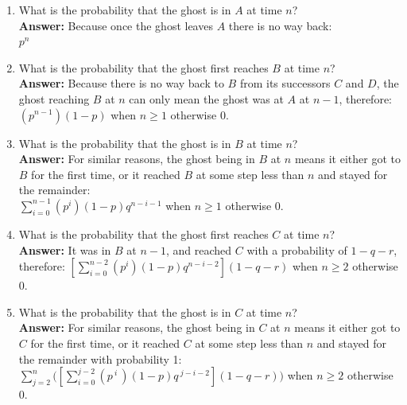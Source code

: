 \documentclass{homework}
\begin{document}
\begin{enumerate}
    \item What is the probability that the ghost is in $A$ at time $n$?\\
            \textbf{Answer:} Because once the ghost leaves $A$ there is no way back:\\
            $p^n$
    \item What is the probability that the ghost first reaches $B$ at time $n$?\\
            \textbf{Answer:} Because there is no way back to $B$ from its successors $C$ and $D$, the ghost reaching $B$ at $n$ can only mean the ghost was at $A$ at $n - 1$, therefore:\\ 
            $(p^{n-1})(1 - p)$ when $n \geq 1$ otherwise $0$. 
    \item What is the probability that the ghost is in $B$ at time $n$?\\
            \textbf{Answer:} For similar reasons, the ghost being in $B$ at $n$ means it either got to $B$ for the first time, or it reached $B$ at some step less than $n$ and stayed for the remainder:\\
            $\sum\limits_{i=0}^{n - 1}{(p^{i})(1 - p)q^{n - i - 1}}$ when $n \geq 1$ otherwise $0$. 
    \item What is the probability that the ghost first reaches $C$ at time $n$?\\
            \textbf{Answer:} It was in $B$ at $n-1$, and reached $C$ with a probability of $1 - q - r$, therefore:
            $[\sum\limits_{i=0}^{n - 2}{(p^{i})(1 - p)q^{n - i - 2}}](1 - q - r) $ when $n \geq 2$ otherwise $0$. 
    \item What is the probability that the ghost is in $C$ at time $n$?\\
            \textbf{Answer:} For similar reasons, the ghost being in $C$ at $n$ means it either got to $C$ for the first time, or it reached $C$ at some step less than $n$ and stayed for the remainder with probability 1:\\
            $\sum\limits_{j=2}^{n}\big( [\sum\limits_{i=0}^{j - 2}{(p^{\ i \ })(1 - p)q^{\ j - i - 2}}](1 - q - r) \big) $ when $n \geq 2$ otherwise $0$. 
\end{enumerate}
\end{document}
